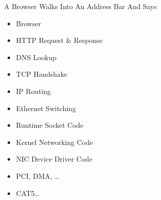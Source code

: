 \documentclass[presentation]{beamer}
\begin{document}
\begin{frame}[label={sec:org2e25571}]{A Browser Walks Into An Address Bar And Says}
\begin{itemize}
\item Browser
\end{itemize}
\pause
\begin{itemize}
\item HTTP Request \& Response
\end{itemize}
\pause
\begin{itemize}
\item DNS Lookup
\end{itemize}
\pause
\begin{itemize}
\item TCP Handshake
\end{itemize}
\pause
\begin{itemize}
\item IP Routing
\end{itemize}
\pause
\begin{itemize}
\item Ethernet Switching
\end{itemize}
\pause
\begin{itemize}
\item Runtime Socket Code
\end{itemize}
\pause
\begin{itemize}
\item Kernel Networking Code
\end{itemize}
\pause
\begin{itemize}
\item NIC Device Driver Code
\end{itemize}
\pause
\begin{itemize}
\item PCI, DMA, \ldots{}
\end{itemize}
\pause
\begin{itemize}
\item CAT5\ldots{}
\end{itemize}
\end{frame}
\end{document}
